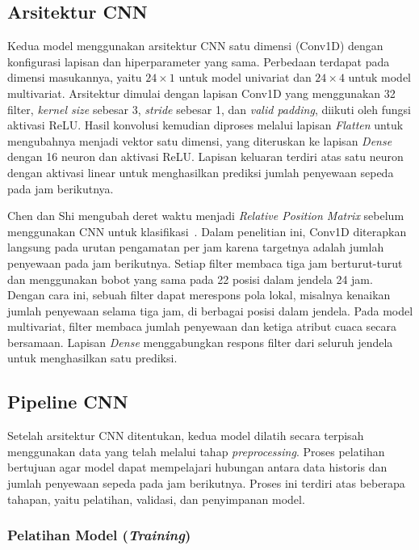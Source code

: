 \documentclass[10pt,conference]{IEEEtran}
\begin{document}
\subsection{Arsitektur CNN}

Kedua model menggunakan arsitektur CNN satu dimensi (Conv1D) dengan konfigurasi lapisan dan hiperparameter yang sama. Perbedaan terdapat pada dimensi masukannya, yaitu \(24 \times 1\) untuk model univariat dan \(24 \times 4\) untuk model multivariat. Arsitektur dimulai dengan lapisan Conv1D yang menggunakan 32 filter, \textit{kernel size} sebesar 3, \textit{stride} sebesar 1, dan \textit{valid padding}, diikuti oleh fungsi aktivasi ReLU. Hasil konvolusi kemudian diproses melalui lapisan \textit{Flatten} untuk mengubahnya menjadi vektor satu dimensi, yang diteruskan ke lapisan \textit{Dense} dengan 16 neuron dan aktivasi ReLU. Lapisan keluaran terdiri atas satu neuron dengan aktivasi linear untuk menghasilkan prediksi jumlah penyewaan sepeda pada jam berikutnya.

Chen dan Shi mengubah deret waktu menjadi \textit{Relative Position Matrix} sebelum menggunakan CNN untuk klasifikasi~\cite{chen-shi-rpm}. Dalam penelitian ini, Conv1D diterapkan langsung pada urutan pengamatan per jam karena targetnya adalah jumlah penyewaan pada jam berikutnya. Setiap filter membaca tiga jam berturut-turut dan menggunakan bobot yang sama pada 22 posisi dalam jendela 24 jam. Dengan cara ini, sebuah filter dapat merespons pola lokal, misalnya kenaikan jumlah penyewaan selama tiga jam, di berbagai posisi dalam jendela. Pada model multivariat, filter membaca jumlah penyewaan dan ketiga atribut cuaca secara bersamaan. Lapisan \textit{Dense} menggabungkan respons filter dari seluruh jendela untuk menghasilkan satu prediksi.

\subsection{Pipeline CNN}

Setelah arsitektur CNN ditentukan, kedua model dilatih secara terpisah menggunakan data yang telah melalui tahap \textit{preprocessing}. Proses pelatihan bertujuan agar model dapat mempelajari hubungan antara data historis dan jumlah penyewaan sepeda pada jam berikutnya. Proses ini terdiri atas beberapa tahapan, yaitu pelatihan, validasi, dan penyimpanan model.

\subsubsection{Pelatihan Model (\textit{Training})}
\leavevmode\par\nopagebreak
\end{document}
